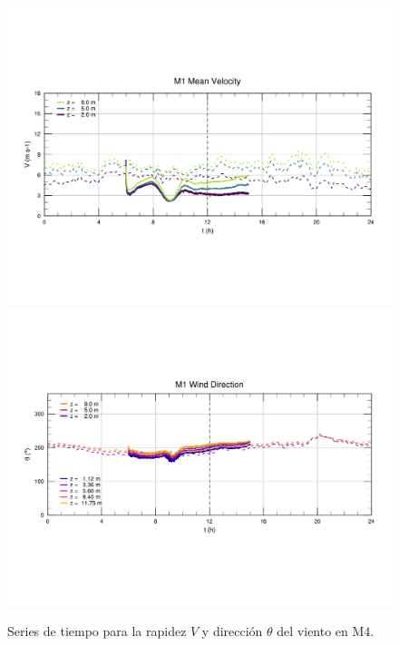 \begin{figure}[H]
	\centering
	\includegraphics[width=0.87\linewidth,page=4,trim={9mm 57mm 10mm 60mm},clip]{Imagenes/06/bol/ts_interpol_compare.pdf}\\%
	\includegraphics[width=0.87\linewidth,page=4,trim={12mm 52mm 10mm 60mm},clip]{Imagenes/06/bol/ts_interpol_compare_o.pdf}%
	\vspace{-2mm}\caption{Series de tiempo para la rapidez $V$ y dirección $\theta$ del viento en M4.}
	\label{fig:06_bol_ts_m4}
\end{figure}

